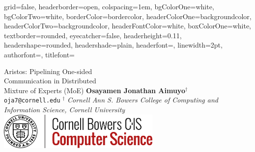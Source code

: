 \documentclass[a0paper,portrait]{baposter}
\begin{document}
    \begin{poster}
    {
        grid=false,
        headerborder=open, %
        colspacing=1em, %
        bgColorOne=white, %
        bgColorTwo=white, %
        borderColor=bordercolor, %
        headerColorOne=backgroundcolor, %
        headerColorTwo=backgroundcolor, %
        headerFontColor=white, %
        boxColorOne=white, %
        textborder=rounded, %
        eyecatcher=false, %
        headerheight=0.11\textheight, %
        headershape=rounded, %
        headershade=plain,
        headerfont=\Large\textsf, %
        linewidth=2pt, %
        authorfont=\normalsize\sffamily\mdseries\setlength\baselineskip{2.2ex}, %
        titlefont=\sffamily\bfseries\Huge\setlength{\baselineskip}{2.2ex}%
    }

%
%
    {
        Aristos: Pipelining One-sided \\ Communication in Distributed \\ Mixture of Experts (MoE)
    }
    {
        \vspace{-0.1em}
        \textbf{Osayamen Jonathan Aimuyo}$^{\dagger}$\vspace{0.1em}\\%
        \small{\texttt{oja7@cornell.edu} \; $^{\dagger}$
            \textit{Cornell Ann S. Bowers College of Computing and Information Science, Cornell University}}
        \vspace{-1.1em}
    }
    {
        \centering
        \includegraphics[width=8cm,keepaspectratio]{figures/cornell}
    }



\end{poster}
\end{document}
